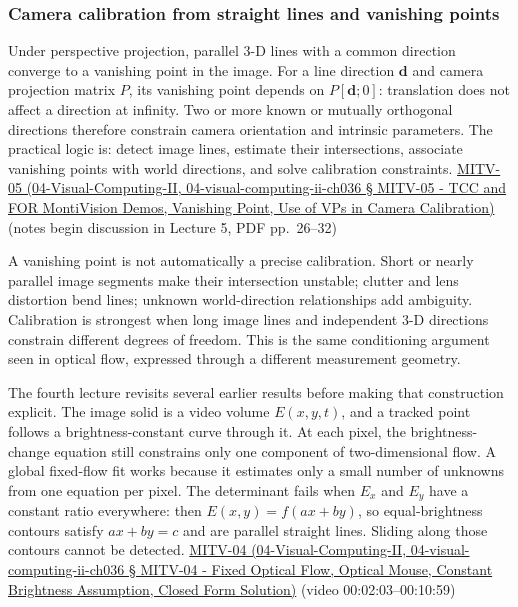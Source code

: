 \subsubsection{Camera calibration from straight lines and vanishing points}\label{camera-calibration-from-straight-lines-and-vanishing-points}

Under perspective projection, parallel 3-D lines with a common direction converge to a vanishing point in the image. For a line direction \(\mathbf{d}\) and camera projection matrix \(P\), its vanishing point depends on \(P[\mathbf{d};0]\): translation does not affect a direction at infinity. Two or more known or mutually orthogonal directions therefore constrain camera orientation and intrinsic parameters. The practical logic is: detect image lines, estimate their intersections, associate vanishing points with world directions, and solve calibration constraints. \href{}{MITV-05 (04-Visual-Computing-II, 04-visual-computing-ii-ch036 § MITV-05 - TCC and FOR MontiVision Demos, Vanishing Point, Use of VPs in Camera Calibration)} (notes begin discussion in Lecture 5, PDF pp.~26--32)

A vanishing point is not automatically a precise calibration. Short or nearly parallel image segments make their intersection unstable; clutter and lens distortion bend lines; unknown world-direction relationships add ambiguity. Calibration is strongest when long image lines and independent 3-D directions constrain different degrees of freedom. This is the same conditioning argument seen in optical flow, expressed through a different measurement geometry.

The fourth lecture revisits several earlier results before making that construction explicit. The image solid is a video volume \(E(x,y,t)\), and a tracked point follows a brightness-constant curve through it. At each pixel, the brightness-change equation still constrains only one component of two-dimensional flow. A global fixed-flow fit works because it estimates only a small number of unknowns from one equation per pixel. The determinant fails when \(E_x\) and \(E_y\) have a constant ratio everywhere: then \(E(x,y)=f(ax+by)\), so equal-brightness contours satisfy \(ax+by=c\) and are parallel straight lines. Sliding along those contours cannot be detected. \href{}{MITV-04 (04-Visual-Computing-II, 04-visual-computing-ii-ch036 § MITV-04 - Fixed Optical Flow, Optical Mouse, Constant Brightness Assumption, Closed Form Solution)} (video 00:02:03--00:10:59)

